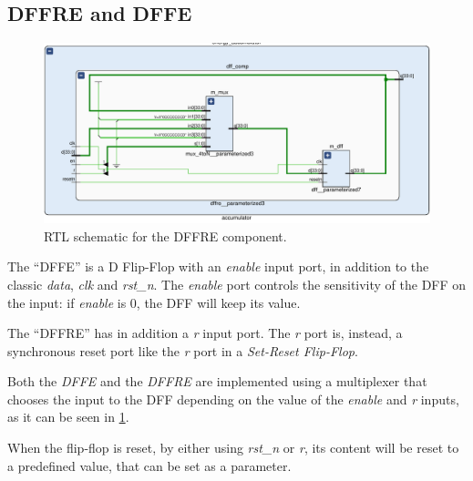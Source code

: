 \subsection{DFFRE and DFFE}
\begin{figure}[]
  \centering
  \includegraphics[width=\textwidth]{figs/dffre_schematic.pdf}
  \caption{RTL schematic for the DFFRE component.}
  \label{fig:dffre}
\end{figure}

The ``DFFE'' is a D Flip-Flop with an \emph{enable} input port,
in addition to the classic \emph{data}, \emph{clk} and \emph{rst\_n}.
The \emph{enable} port controls the sensitivity of the DFF on the input: if
\emph{enable} is 0, the DFF will keep its value.

The ``DFFRE'' has in addition a \emph{r} input port. The \emph{r} port is, instead,
a synchronous reset port like the \emph{r} port in a \emph{Set-Reset Flip-Flop}.

Both the \emph{DFFE} and the \emph{DFFRE} are implemented using a multiplexer that
chooses the input to the DFF depending on the value of the \emph{enable} and
\emph{r} inputs, as it can be seen in \cref{fig:dffre}.

When the flip-flop is reset, by either using \emph{rst\_n} or \emph{r}, its
content will be reset to a predefined value, that can be set as a parameter.
